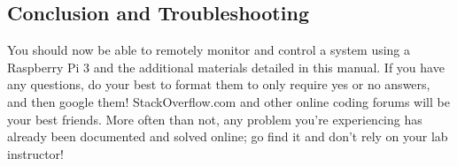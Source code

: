 \documentclass{article}
\begin{document}
\subsection{Conclusion and Troubleshooting}
  You should now be able to remotely monitor and control a system using a Raspberry Pi 3 and the additional materials detailed in this manual. If you have any questions, do your best to format them to only require yes or no answers, and then google them! StackOverflow.com and other online coding forums will be your best friends. More often than not, any problem you're experiencing has already been documented and solved online; go find it and don't rely on your lab instructor!
\end{document}

